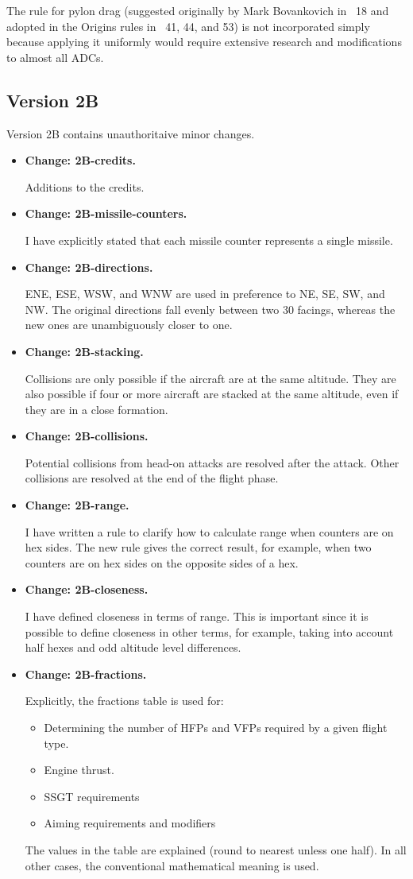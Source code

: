 \documentclass[10pt]{report}
\newcommand{\itemtag}[1]{\item \textbf{Change: #1.}\par}
\begin{document}
The rule for pylon drag (suggested originally by Mark Bovankovich in {\APJ}~18 and adopted in the Origins rules in {\APJ}~41, 44, and 53) is not incorporated simply because applying it uniformly would require extensive research and modifications to almost all ADCs.

\subsection{Version 2B}

Version 2B contains unauthoritaive minor changes.

\begin{itemize}
    \itemtag{2B-credits} Additions to the credits.
    
    \itemtag{2B-missile-counters} I have explicitly stated that each missile counter represents a single missile.

    \itemtag{2B-directions} ENE, ESE, WSW, and WNW are used in preference to NE, SE, SW, and NW. The original directions fall evenly between two 30{\deg} facings, whereas the new  ones are unambiguously closer to one.

    \itemtag{2B-stacking} Collisions are only possible if the aircraft are at the same altitude. They are also possible if four or more aircraft are stacked at the same altitude, even if they are in a close formation.

    \itemtag{2B-collisions} Potential collisions from head-on attacks are resolved after the attack. Other collisions are resolved at the end of the flight phase.

    \itemtag{2B-range} I have written a rule to clarify how to calculate range when counters are on hex sides. The new rule gives the correct result, for example, when two counters are on hex sides on the opposite sides of a hex.
    
    \itemtag{2B-closeness} I have defined closeness in terms of range. This is important since it is possible to define closeness in other terms, for example, taking into account half hexes and odd altitude level differences.

    \itemtag{2B-fractions} Explicitly, the fractions table is used for:
    \begin{itemize}
        \item Determining the number of HFPs and VFPs required by a given flight type.
        \item Engine thrust.
        \item SSGT requirements
        \item Aiming requirements and modifiers
    \end{itemize}
    The values in the table are explained (round to nearest unless one half). In all other cases, the conventional mathematical meaning is used.


\end{itemize}
\end{document}
